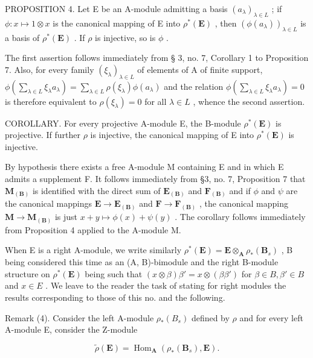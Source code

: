 PROPOSITION 4. Let E be an A-module admitting a basis \((a_{\lambda})_{\lambda \in L}\) ; if \(\phi : x \mapsto 1 \otimes x\) is the canonical mapping of E into \(\rho^{*}(\mathbf{E})\) , then \((\phi(a_{\lambda}))_{\lambda \in L}\) is a basis of \(\rho^{*}(\mathbf{E})\) . If \(\rho\) is injective, so is \(\phi\) .

The first assertion follows immediately from § 3, no. 7, Corollary 1 to Proposition 7. Also, for every family \((\xi_{\lambda})_{\lambda \in L}\) of elements of A of finite support, \(\phi\left(\sum_{\lambda \in L} \xi_{\lambda} a_{\lambda}\right) = \sum_{\lambda \in L} \rho(\xi_{\lambda}) \phi(a_{\lambda})\) and the relation \(\phi\left(\sum_{\lambda \in L} \xi_{\lambda} a_{\lambda}\right) = 0\) is therefore equivalent to \(\rho(\xi_{\lambda}) = 0\) for all \(\lambda \in L\) , whence the second assertion.

COROLLARY. For every projective A-module E, the B-module \(\rho^{*}(\mathbf{E})\) is projective. If further \(\rho\) is injective, the canonical mapping of E into \(\rho^{*}(\mathbf{E})\) is injective.

By hypothesis there exists a free A-module M containing E and in which E admits a supplement F. It follows immediately from §3, no. 7, Proposition 7 that \(\mathbf{M}_{(\mathbf{B})}\) is identified with the direct sum of \(\mathbf{E}_{(\mathbf{B})}\) and \(\mathbf{F}_{(\mathbf{B})}\) and if \(\phi\) and \(\psi\) are the canonical mappings \(\mathbf{E} \to \mathbf{E}_{(\mathbf{B})}\) and \(\mathbf{F} \to \mathbf{F}_{(\mathbf{B})}\) , the canonical mapping \(\mathbf{M} \to \mathbf{M}_{(\mathbf{B})}\) is just \(x + y \mapsto \phi(x) + \psi(y)\) . The corollary follows immediately from Proposition 4 applied to the A-module M.

When E is a right A-module, we write similarly \(\rho^{*}(\mathbf{E}) = \mathbf{E} \otimes_{\mathbf{A}} \rho_{*}(\mathbf{B}_{s})\) , B being considered this time as an (A, B)-bimodule and the right B-module structure on \(\rho^{*}(\mathbf{E})\) being such that \((x \otimes \beta)\beta' = x \otimes (\beta\beta')\) for \(\beta \in B, \beta' \in B\) and \(x \in E\) . We leave to the reader the task of stating for right modules the results corresponding to those of this no. and the following.

Remark (4). Consider the left A-module \(\rho_{*}(B_{s})\) defined by \(\rho\) and for every left A-module E, consider the Z-module

\[
\tilde {\rho} (\mathbf {E}) = \operatorname{Hom} _ {\mathbf {A}} \left(\rho_ {*} \left(\mathbf {B} _ {s}\right), \mathbf {E}\right).\tag{6}
\]

